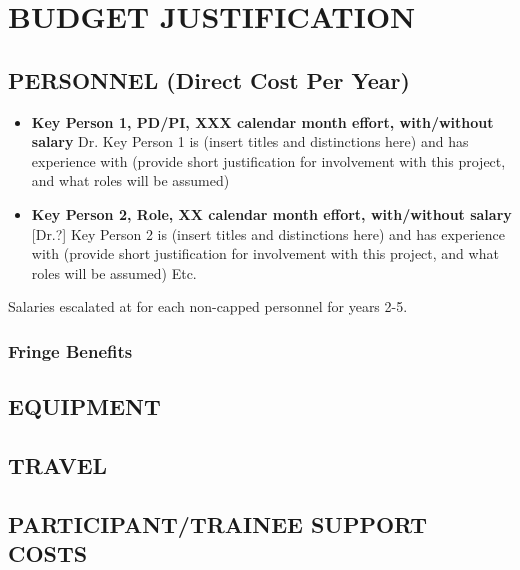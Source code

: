 \documentclass[../main.tex]{subfiles}
\begin{document}

\section{BUDGET JUSTIFICATION}

\subsection{PERSONNEL (Direct Cost Per Year)}
\begin{itemize}
    \item \textbf{Key Person 1, PD/PI, XXX calendar month effort, with/without salary} 
    Dr. Key Person 1 is (insert titles and distinctions here) and has experience with (provide short justification for involvement with this project, and what roles will be assumed)
    \item \textbf{Key Person 2, Role, XX calendar month effort, with/without salary}
    [Dr.?] Key Person 2 is (insert titles and distinctions here) and has experience with (provide short justification for involvement with this project, and what roles will be assumed) Etc.
\end{itemize}


Salaries escalated at  for each non-capped personnel for years 2-5.


\subsubsection{Fringe Benefits}



\subsection{EQUIPMENT}


\subsection{TRAVEL}

\subsection{PARTICIPANT/TRAINEE SUPPORT COSTS}
\end{document}
